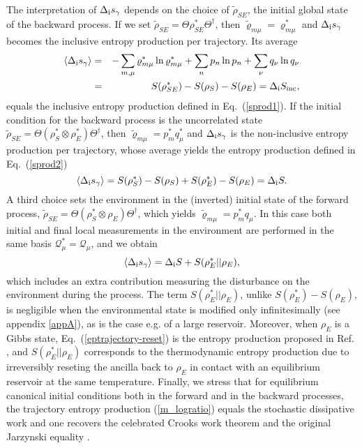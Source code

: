 \documentclass[aps,prx,twocolumn,showpacs,floatfix,superscriptaddress,graphics,longbibliography]{revtex4-1}
\newcommand{\HAT}{}
\begin{document}
The interpretation of $\Delta_{\rm i} s_\gamma$ depends on the choice of $\tilde\rho_{SE}$, the initial global state of the backward process. 
If we set $\tilde{\rho}_{SE} = \HAT\Theta \rho_{SE}^\ast \HAT\Theta^\dagger$, then $\tilde \varrho_{m\mu}=\varrho^*_{m\mu}$ and $\Delta_{\rm i} s_\gamma$  becomes the inclusive entropy production per trajectory. 
Its average
\begin{eqnarray}\nonumber
\langle \Delta_{\rm i} s_\gamma \rangle &=& -\sum_{m,\mu} \varrho^*_{m\mu}\ln \varrho^*_{m\mu} +\sum_n p_n\ln p_n+\sum_\nu q_\nu\ln q_\nu \nonumber \\
&=& S(\rho^*_{SE})-S(\rho_S)-S(\rho_E)=\Delta_{\rm i} S_{\rm inc},
\end{eqnarray}
equals the inclusive entropy production defined in Eq.~(\ref{sprod1}). 
If the initial condition for the backward process is the uncorrelated state $\tilde{\rho}_{SE} = \HAT\Theta (\rho_{S}^\ast\otimes  \rho_{E}^\ast ) \HAT\Theta^\dagger$, 
then $\tilde \varrho_{m\mu}=p^*_{m}q^*_{\mu}$ and $\Delta_{\rm i} s_\gamma$ is the non-inclusive entropy production per trajectory, whose average yields the entropy 
production defined in Eq.~(\ref{sprod2})
\begin{equation}
\langle \Delta_{\rm i} s_\gamma\rangle=S(\rho^*_S)-S(\rho_S)+S(\rho^*_E)-S(\rho_E)=\Delta_{\rm i} S. 
\end{equation}
A third choice sets the environment in the (inverted) initial state of the forward process, $\tilde{\rho}_{SE} = \HAT\Theta (\rho_{S}^\ast \otimes  \rho_{E}) \HAT\Theta^\dagger$, which yields $\tilde \varrho_{m\mu}=p^*_{m}q_{\mu}$. 
In this case both initial and final local measurements in the environment are performed in the same basis $\mathcal{Q}_\mu^\ast = \mathcal{Q}_\mu$, and we obtain
\begin{equation} \label{eptrajectory-reset}
 \langle \Delta_{\rm i} s_\gamma\rangle = \Delta_{\rm i} S + S(\rho_E^\ast || \rho_E),
\end{equation}
which includes an extra contribution measuring the disturbance on the environment during the process. The term $S(\rho_E^\ast || \rho_E)$, unlike $S(\rho_E^\ast) - S(\rho_E)$, is negligible when the environmental state is modified only infinitesimally (see appendix \ref{appA}), 
as is the case e.g. of a large reservoir. Moreover, when $\rho_E$ is a Gibbs state, Eq.~(\ref{eptrajectory-reset}) is the entropy production proposed in Ref. \cite{EspositoNJP}, and $S(\rho_E^\ast || \rho_E)$ 
corresponds to the thermodynamic entropy production due to irreversibly reseting the ancilla back to $\rho_E$ in contact with an equilibrium reservoir at the same temperature. Finally, we stress that for equilibrium canonical initial conditions both in 
the forward and in the backward processes, the trajectory entropy production (\ref{m_logratio}) equals the stochastic dissipative work and one recovers the celebrated Crooks work theorem and the original Jarzynski equality \cite{CampisiREV, EspositoREV}.
\end{document}
